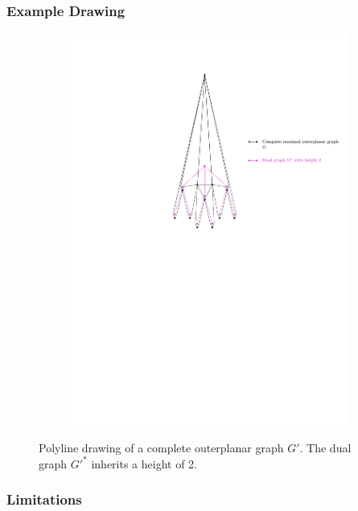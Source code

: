 \subsubsection{Example Drawing}

	\begin{figure}[H]
	\centering
	\begin{subfigure}{\textwidth}
		\centering
		\includegraphics[page=1,width=0.7\linewidth]{graphics/complete_maximal_outerplanar_weak_dual_graph_example_drawing.pdf}
	\end{subfigure}
	\caption{Polyline drawing of a complete outerplanar graph $G'$. The dual graph $G'^*$ inherits a height of 2.}
\end{figure}


\subsubsection{Limitations}

